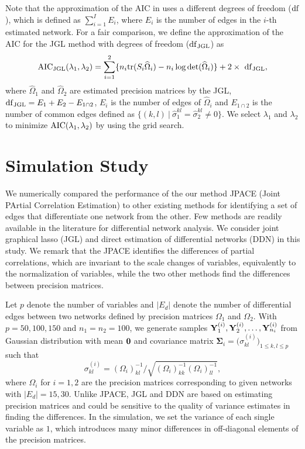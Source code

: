 \documentclass[useAMS,usenatbib,referee]{bio}
\newcommand{\bs}{\boldsymbol}
\begin{document}
{Note that the approximation of the AIC in \citet{Danaher:2014} uses a different degrees of freedom (${\rm df}$), which is defined as $ \sum_{i=1}^I E_i$, where $E_i$ is the number of edges in the $i$-th estimated network. 
For a fair comparison, we define the approximation of the AIC for the JGL method with degrees of freedom (${\rm df}_{\rm JGL}$) as
\begin{equation} \nonumber 
{\rm AIC}_{\rm JGL}(\lambda_1,\lambda_2)=
 \sum_{i=1}^2 \{ n_i {\rm tr}(S_i \widehat{\Omega}_i) - n_i \log {\rm det}(\widehat{\Omega}_i) \} + 2 \times ~ {\rm df}_{\rm JGL},
\end{equation}
where $\widehat{\Omega}_1$ and $\widehat{\Omega}_2$ are estimated precision matrices by the JGL, ${\rm df}_{\rm JGL}= E_1 + E_2 - E_{1 \cap 2}$, $E_i$ is the number of edges of $\widehat{\Omega}_i$ and $E_{1 \cap 2}$ is the number of common edges defined as $\{ (k,l) ~|~ \widehat{\sigma}_1^{kl} = \widehat{\sigma}_2^{kl} \neq 0\}$. 
We select $\lambda_1$ and $\lambda_2$ to minimize ${\rm AIC}(\lambda_1,\lambda_2)$ by using the grid search.




\section{Simulation Study}

We numerically compared the performance of the our method JPACE (Joint PArtial Correlation Estimation) to other existing methods for identifying a set of edges that differentiate one network from the other. Few methods are readily available in the literature for differential network analysis. 
We consider joint graphical lasso (JGL) and direct estimation of differential networks (DDN) in this study. 
We remark that the JPACE identifies the differences of partial correlations, which are invariant to the scale changes of variables, equivalently to the normalization of variables, while the two other methods find the differences between precision matrices.


Let $p$ denote the number of variables and $|E_d|$ denote the number of differential edges between two networks defined by precision matrices $\Omega_1$ and $\Omega_2$.
With $p=50, 100, 150$ and $n_1=n_2=100$,
we generate samples ${\bf Y}^{(i)}_1, {\bf Y}^{(i)}_2, \ldots,{\bf Y}^{(i)}_{n_i} $ from Gaussian distribution with mean ${\bf 0}$ and covariance matrix $\bs{\Sigma}_i = \big(\sigma_{kl}^{(i)}\big)_{1\le k,l \le p}$  such that 
\begin{equation} \nonumber
\sigma_{kl}^{(i)} = (\Omega_i)^{-1}_{kl} \big / \sqrt{(\Omega_i)^{-1}_{kk} (\Omega_i)^{-1}_{ll}} ,
\end{equation}
where $\Omega_i$ for $i=1,2$ are the precision matrices corresponding to given networks with $|E_d | = 15, 30$. Unlike JPACE, JGL and DDN are based on estimating precision matrices and could be sensitive to the quality of variance estimates in finding the differences. 
In the simulation, we set the variance of each single variable as $1$, which introduces many minor differences in off-diagonal elements of the precision matrices.

}
\end{document}
